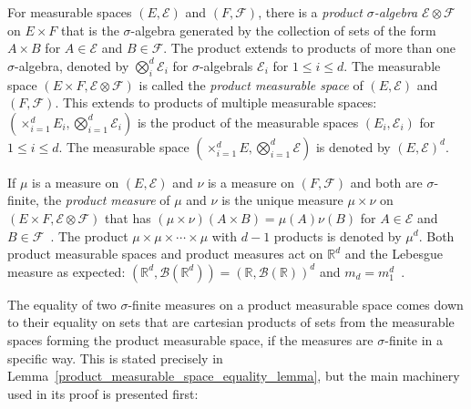 \documentclass[english,twoside,openright]{HYgraduMLDS}
\newcommand{\R}{\mathbb{R}}
\DeclareMathOperator*{\bigtimes}{\times}
\begin{document}
For measurable spaces \((E, \mathcal{E})\) and \((F, \mathcal{F})\),
there is a \emph{product \(\sigma\)-algebra} \(\mathcal{E}\otimes \mathcal{F}\)
on \(E\times F\) that is the \(\sigma\)-algebra generated
by the collection of sets of the form \(A\times B\) for \(A\in \mathcal{E}\) and
\(B\in\mathcal{F}\). The product extends to products of more than one
\(\sigma\)-algebra, denoted by \(\bigotimes_{i}^{d}\mathcal{E}_{i}\) for
\(\sigma\)-algebrals \(\mathcal{E}_{i}\) for \(1\leq i \leq d\).
The measurable space \((E\times F, \mathcal{E}\otimes \mathcal{F})\) is called
the \emph{product measurable space} of \((E, \mathcal{E})\) and \((F, \mathcal{F})\).
This extends to products of multiple measurable spaces:
\((\bigtimes_{i=1}^{d}E_{i}, \bigotimes_{i=1}^{d}\mathcal{E}_{i})\) is the
product of the measurable spaces \((E_{i}, \mathcal{E}_{i})\) for
\(1\leq i \leq d\).
The measurable space \((\bigtimes_{i=1}^{d}E, \bigotimes_{i=1}^{d}\mathcal{E})\)
is denoted by \((E, \mathcal{E})^{d}\).

If \(\mu\) is a measure on
\((E, \mathcal{E})\) and \(\nu\) is a measure on \((F, \mathcal{F})\) and both
are \(\sigma\)-finite, the
\emph{product measure} of \(\mu\) and \(\nu\) is the unique measure \(\mu\times\nu\)
on \((E\times F, \mathcal{E}\otimes \mathcal{F})\) that
has \((\mu\times\nu)(A\times B) = \mu(A)\nu(B)\) for \(A\in \mathcal{E}\) and
\(B\in \mathcal{F}\)~\cite{Cin11}. The product
\(\mu\times \mu\times \dotsb \times \mu\) with \(d - 1\) products is denoted by
\(\mu^{d}\). Both product measurable spaces and product measures act on
\(\R^{d}\) and the Lebesgue measure as expected:
\((\R^{d}, \mathcal{B}(\R^{d})) = (\R, \mathcal{B}(\R))^{d}\) and
\(m_{d} = m_{1}^{d}\)~\cite{Cin11}.

The equality of two \(\sigma\)-finite measures on a product measurable space
comes down to
their equality on sets that are cartesian products of sets from the measurable
spaces forming the product measurable space, if the measures are
\(\sigma\)-finite in a specific way. This is stated precisely in
Lemma~\ref{product_measurable_space_equality_lemma}, but the main machinery
used in its proof is presented first:
\end{document}

